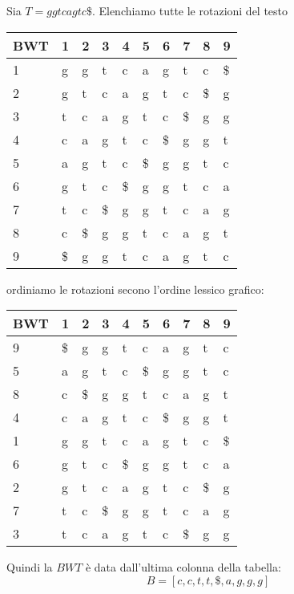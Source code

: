 \begin{esempio}
    Sia $T = ggtcagtc\$$. Elenchiamo tutte le rotazioni del testo
    \begin{table}[!ht]
        \centering
        \begin{tabular}{|l|l|l|l|l|l|l|l|l|l|}
            \hline
            BWT & 1  & 2  & 3  & 4  & 5  & 6  & 7  & 8  & 9  \\ \hline
            1   & g  & g  & t  & c  & a  & g  & t  & c  & \$ \\ \hline
            2   & g  & t  & c  & a  & g  & t  & c  & \$ & g  \\ \hline
            3   & t  & c  & a  & g  & t  & c  & \$ & g  & g  \\ \hline
            4   & c  & a  & g  & t  & c  & \$ & g  & g  & t  \\ \hline
            5   & a  & g  & t  & c  & \$ & g  & g  & t  & c  \\ \hline
            6   & g  & t  & c  & \$ & g  & g  & t  & c  & a  \\ \hline
            7   & t  & c  & \$ & g  & g  & t  & c  & a  & g  \\ \hline
            8   & c  & \$ & g  & g  & t  & c  & a  & g  & t  \\ \hline
            9   & \$ & g  & g  & t  & c  & a  & g  & t  & c  \\ \hline
        \end{tabular}
    \end{table}
    ordiniamo le rotazioni secono l'ordine lessico grafico:
    \begin{table}[!ht]
        \centering
        \begin{tabular}{|l|l|l|l|l|l|l|l|l|l|}
            \hline
            BWT & 1  & 2  & 3  & 4  & 5  & 6  & 7  & 8  & 9  \\ \hline
            9   & \$ & g  & g  & t  & c  & a  & g  & t  & c  \\ \hline
            5   & a  & g  & t  & c  & \$ & g  & g  & t  & c  \\ \hline
            8   & c  & \$ & g  & g  & t  & c  & a  & g  & t  \\ \hline
            4   & c  & a  & g  & t  & c  & \$ & g  & g  & t  \\ \hline
            1   & g  & g  & t  & c  & a  & g  & t  & c  & \$ \\ \hline
            6   & g  & t  & c  & \$ & g  & g  & t  & c  & a  \\ \hline
            2   & g  & t  & c  & a  & g  & t  & c  & \$ & g  \\ \hline
            7   & t  & c  & \$ & g  & g  & t  & c  & a  & g  \\ \hline
            3   & t  & c  & a  & g  & t  & c  & \$ & g  & g  \\ \hline
        \end{tabular}
    \end{table}
    Quindi la $BWT$ è data dall'ultima colonna della tabella:
    \begin{equation}
        B = [c, c, t, t, \$, a, g, g, g]
    \end{equation}
\end{esempio}
